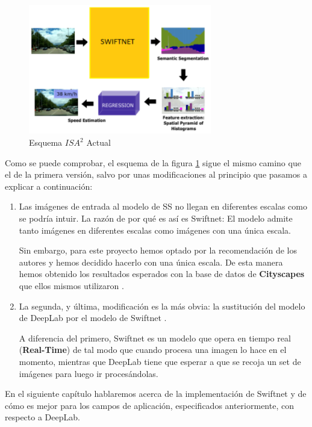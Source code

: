 \begin{figure}[H]
  \centering
  \includegraphics[width=8cm]{Figuras/Figura_Esquema_ISA2_Version_2.eps}
  \caption{Esquema $ISA^{2}$ Actual}
    \label{fig:Isa_v2}
\end{figure}


Como se puede comprobar, el esquema de la figura \ref{fig:Isa_v2} sigue el mismo camino que el de la primera versión, salvo por unas modificaciones al principio que pasamos a explicar a continuación:

\begin{enumerate}

\item Las imágenes de entrada al modelo de \ac{SS} no llegan en diferentes escalas como se podría intuir. La razón de por qué es así es Swiftnet: El modelo admite tanto imágenes en diferentes escalas como imágenes con una única escala.


Sin embargo, para este proyecto hemos optado por la recomendación de los autores \cite{github_swiftnet} y hemos decidido hacerlo con una única escala. De esta manera hemos obtenido los resultados esperados con la base de datos de \textbf{Cityscapes} \cite{cityscapes} que ellos mismos utilizaron \cite{swiftnet}.

\item La segunda, y última, modificación es la más obvia: la sustitución del modelo de DeepLab \cite{deeplab} por el modelo de Swiftnet \cite{swiftnet}.

A diferencia del primero, Swiftnet es un modelo que opera en tiempo real (\textbf{Real-Time}) de tal modo que cuando procesa una imagen lo hace en el momento, mientras que DeepLab tiene que esperar a que se recoja un set de imágenes para luego ir procesándolas.

\end{enumerate}


En el siguiente capítulo hablaremos acerca de la implementación de Swiftnet y de cómo es mejor para los campos de aplicación, especificados anteriormente, con respecto a DeepLab.
